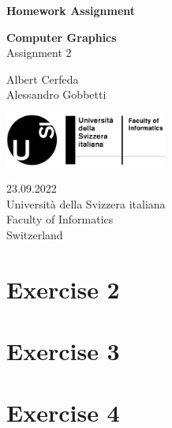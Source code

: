 \documentclass[tikz,14pt,fleqn]{article}
\newcommand\namesurname{Albert Cerfeda\\Alessandro Gobbetti}
\newcommand\assignment{Assignment 2}
\newcommand\subject{Computer Graphics}
\newcommand\documentdate{23.09.2022}
\begin{document}
\begin{titlepage}
   \begin{center}
       \vspace*{1cm}

       \textbf{\Large{Homework Assignment}}

       \vspace{0.5cm}
        \textbf{\subject}\\[5mm]
       \assignment
        
            
       \vspace{1.8cm}

        \namesurname
       \tableofcontents

       \vspace*{\fill}
     
       \includegraphics[width=0.4\textwidth]{logo.png}
       
        \documentdate \\
        Università della Svizzera italiana\\
        Faculty of Informatics\\
        Switzerland\\

   \end{center}
\end{titlepage}


\section{Exercise 2}


\section{Exercise 3}


\section{Exercise 4}

    
    

\clearpage
\end{document}
